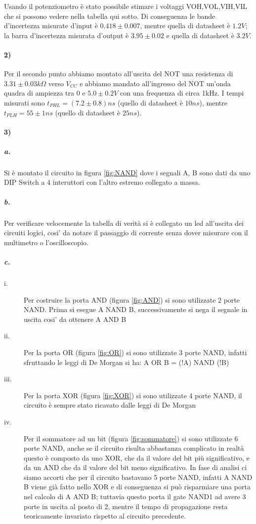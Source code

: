 \documentclass{article}
\begin{document}
	Usando il potenziometro è stato possibile stimare i voltaggi VOH,VOL,VIH,VIL che si possono vedere nella tabella qui sotto.\newline
	Di conseguenza le bande d'incertezza misurate d'input è $0.418\pm0.007$, mentre quella di datasheet è $1.2 V$; la barra d'incertezza misurata d'output è $3.95\pm0.02$ e quella di datasheet è $3.2 V$.
	\begin{center}
		
	\end{center}

\paragraph{2)}
	Per il secondo punto abbiamo montato all'uscita del NOT una resistenza di $3.31\pm0.03 k\Omega$ verso $V_{CC}$ e abbiamo mandato all'ingresso del NOT un'onda quadra di ampiezza tra $0$ e $5.0\pm0.2 V$ con una frequenza di circa 1kHz.
	I tempi misurati sono $t_{PHL}=(7.2\pm0.8)ns$ (quello di datasheet è $10ns$), mentre $t_{PLH}=55\pm 1 ns$ (quello di datasheet è $25ns$).
	
\paragraph{3)}
	\subparagraph{a.}
	Si è montato il circuito in figura \ref{fig:NAND} dove i segnali A, B sono dati da uno DIP Switch a 4 interuttori con l'altro estremo collegato a massa.
	\subparagraph{b.}
	Per verificare velocemente la tabella di verità si è collegato un led all'uscita dei circuiti logici, cosi' da notare il passaggio di corrente senza dover misurare con il multimetro o l'oscilloscopio.
	
	\subparagraph{c.}
	\begin{description}
		\item[i.] Per costruire la porta AND (figura \ref{fig:AND}) si sono utilizzate 2 porte NAND. Prima si esegue A NAND B, successivamente si nega il segnale in uscita cosi' da ottenere A AND B
		\item[ii.] Per la porta OR (figura \ref{fig:OR}) si sono utilizzate 3 porte NAND, infatti sfruttando le leggi di De Morgan si ha: A OR B = (!A) NAND (!B) 
		\item[iii.] Per la porta XOR (figura \ref{fig:XOR}) si sono utilizzate 4 porte NAND,  il circuito è sempre stato ricavato dalle leggi di De Morgan
		\item[iv.] Per il sommatore ad un bit (figura \ref{fig:sommatore}) si sono utilizzate 6 porte NAND, anche se il circuito risulta abbastanza complicato in realtà questo è composto  da uno XOR, che da il valore del bit più significativo, e da un AND che da il valore del bit meno significativo. In fase di analisi ci siamo accorti che per il circuito bastavano 5 porte NAND, infatti A NAND B viene già fatto nello XOR e di conseguenza si può risparmiare una porta nel calcolo di A AND B; tuttavia questo porta il gate NAND1 ad avere 3 porte in uscita al posto di 2, mentre il tempo di propagazione resta teoricamente invariato rispetto al circuito precedente.\newline
	\end{description}
\end{document}
